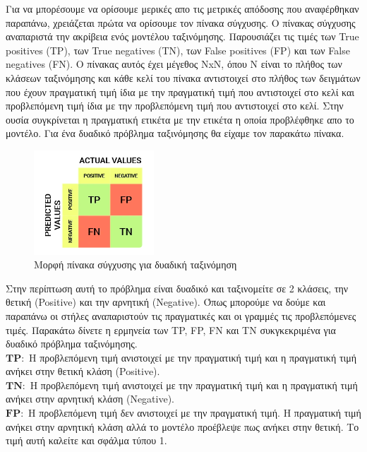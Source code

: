 \documentclass[12pt]{article}
\numberwithin{equation}{section}
\begin{document}
Για να μπορέσουμε να ορίσουμε μερικές απο τις μετρικές απόδοσης που αναφέρθηκαν παραπάνω, χρειάζεται πρώτα να ορίσουμε τον πίνακα σύγχυσης. Ο πίνακας σύγχυσης αναπαριστά την ακρίβεια ενός μοντέλου ταξινόμησης. Παρουσιάζει τις τιμές των True positives (TP), των True negatives (TN), των False positives (FP) και των False negatives (FN). Ο πίνακας αυτός έχει μέγεθος NxN, όπου N είναι το πλήθος των κλάσεων ταξινόμησης και κάθε κελί του πίνακα αντιστοιχεί στο πλήθος των δειγμάτων που έχουν πραγματική τιμή ίδια με την πραγματική τιμή που αντιστοιχεί στο κελί και προβλεπόμενη τιμή ίδια με την προβλεπόμενη τιμή που αντιστοιχεί στο κελί. Στην ουσία συγκρίνεται η πραγματική ετικέτα με την ετικέτα η οποία προβλέφθηκε απο το μοντέλο. Για ένα δυαδικό πρόβλημα ταξινόμησης θα είχαμε τον παρακάτω πίνακα. 

\begin{figure}[h!]
  \centering
  \includegraphics[width=0.4\textwidth]{images/conf_matrix.png} %
  \caption{Μορφή πίνακα σύγχυσης για δυαδική ταξινόμηση}
  \label{figure 9}
\end{figure}

\noindent Στην περίπτωση αυτή το πρόβλημα είναι δυαδικό και ταξινομείτε σε 2 κλάσεις, την θετική (Positive) και την αρνητική (Negative). Όπως μπορούμε να δούμε και παραπάνω οι στήλες αναπαριστούν τις πραγματικές και οι γραμμές τις προβλεπόμενες τιμές. Παρακάτω δίνετε η ερμηνεία των TP, FP, FN και TN συκγκεκριμένα για δυαδικό πρόβλημα ταξινόμησης. \\

\noindent$\mathbf{TP: }$ Η προβλεπόμενη τιμή ανιστοιχεί με την πραγματική τιμή και η πραγματική τιμή ανήκει στην θετική κλάση (Positive). \\

\noindent$\mathbf{TΝ: }$ Η προβλεπόμενη τιμή ανιστοιχεί με την πραγματική τιμή και η πραγματική τιμή ανήκει στην αρνητική κλάση (Negative). \\

\noindent$\mathbf{FP: }$ Η προβλεπόμενη τιμή δεν ανιστοιχεί με την πραγματική τιμή. Η πραγματική τιμή ανήκει στην αρνητική κλάση αλλά το μοντέλο προέβλεψε πως ανήκει στην θετική. Το τιμή αυτή καλείτε και σφάλμα τύπου 1. \\
\end{document}
